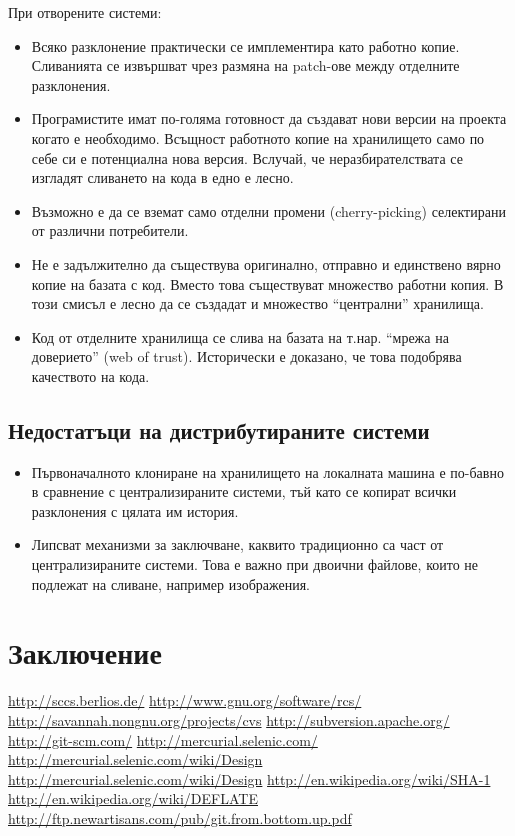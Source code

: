 \documentclass[a4paper]{article}
\begin{document}
      При отворените системи:
      \begin{itemize}
        \item Всяко разклонение практически се имплементира като работно копие. Сливанията се извършват чрез размяна на patch-ове между отделните разклонения.
        \item Програмистите имат по-голяма готовност да създават нови версии на проекта когато е необходимо. Всъщност работното копие на хранилището само по себе си е потенциална нова версия. Вслучай, че неразбирателствата се изгладят сливането на кода в едно е лесно.
        \item Възможно е да се вземат само отделни промени (cherry-picking) селектирани от различни потребители.
        \item Не е задължително да съществува оригинално, отправно и единствено вярно копие на базата с код. Вместо това съществуват множество работни копия. В този смисъл е лесно да се създадат и множество ``централни'' хранилища.
        \item Код от отделните хранилища се слива на базата на т.нар. ``мрежа на доверието'' (web of trust). Исторически е доказано, че това подобрява качеството на кода.
      \end{itemize}

  \subsection{Недостатъци на дистрибутираните системи}
    \begin{itemize}
      \item Първоначалното клониране на хранилището на локалната машина е по-бавно в сравнение с централизираните системи, тъй като се копират всички разклонения с цялата им история.
      \item Липсват механизми за заключване, каквито традиционно са част от централизираните системи. Това е важно при двоични файлове, които не подлежат на сливане, например изображения.
    \end{itemize}

\section{Заключение}

\newpage

\begin{thebibliography}{99}
   \url{http://sccs.berlios.de/}
   \url{http://www.gnu.org/software/rcs/}
   \url{http://savannah.nongnu.org/projects/cvs}
   \url{http://subversion.apache.org/}
   \url{http://git-scm.com/}
   \url{http://mercurial.selenic.com/}
   \url{http://mercurial.selenic.com/wiki/Design}
   \url{http://mercurial.selenic.com/wiki/Design}
   \url{http://en.wikipedia.org/wiki/SHA-1}
   \url{http://en.wikipedia.org/wiki/DEFLATE}
   \url{http://ftp.newartisans.com/pub/git.from.bottom.up.pdf}
\end{thebibliography}
\end{document}
